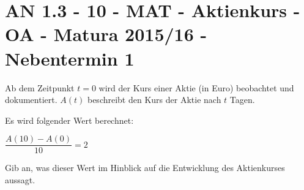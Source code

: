 \section{AN 1.3 - 10 - MAT - Aktienkurs - OA - Matura 2015/16 - Nebentermin 1}

\begin{beispiel}[AN 1.3]{1} %
Ab dem Zeitpunkt $t=0$ wird der Kurs einer Aktie (in Euro) beobachtet und dokumentiert. $A(t)$ beschreibt den Kurs der Aktie nach $t$ Tagen. \leer

Es wird folgender Wert berechnet:

$\dfrac{A(10)-A(0)}{10}=2$ \leer

Gib an, was dieser Wert im Hinblick auf die Entwicklung des Aktienkurses aussagt. 

\end{beispiel}